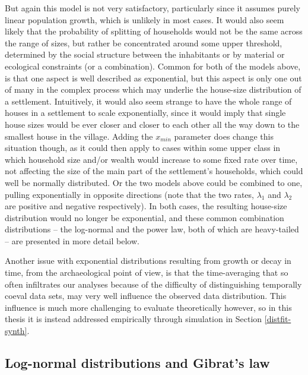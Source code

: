 \documentclass[
  12pt,
  a4paper, twoside]{book}
\begin{document}
But again this model is not very satisfactory, particularly since it assumes purely linear population growth, which is unlikely in most cases. It would also seem likely that the probability of splitting of households would not be the same across the range of sizes, but rather be concentrated around some upper threshold, determined by the social structure between the inhabitants or by material or ecological constraints (or a combination). Common for both of the models above, is that one aspect is well described as exponential, but this aspect is only one out of many in the complex process which may underlie the house-size distribution of a settlement. Intuitively, it would also seem strange to have the whole range of houses in a settlement to scale exponentially, since it would imply that single house sizes would be ever closer and closer to each other all the way down to the smallest house in the village. Adding the \(x_{min}\) parameter does change this situation though, as it could then apply to cases within some upper class in which household size and/or wealth would increase to some fixed rate over time, not affecting the size of the main part of the settlement's households, which could well be normally distributed. Or the two models above could be combined to one, pulling exponentially in opposite directions (note that the two rates, \(\lambda_1\) and \(\lambda_2\) are positive and negative respectively). In both cases, the resulting house-size distribution would no longer be exponential, and these common combination distributions -- the log-normal and the power law, both of which are heavy-tailed -- are presented in more detail below.

Another issue with exponential distributions resulting from growth or decay in time, from the archaeological point of view, is that the time-averaging that so often infiltrates our analyses because of the difficulty of distinguishing temporally coeval data sets, may very well influence the observed data distribution. This influence is much more challenging to evaluate theoretically however, so in this thesis it is instead addressed empirically through simulation in Section \ref{distfit-synth}.

\hypertarget{log-normal-distributions-and-gibrats-law}{%
\subsection{Log-normal distributions and Gibrat's law}\label{log-normal-distributions-and-gibrats-law}}
\end{document}
